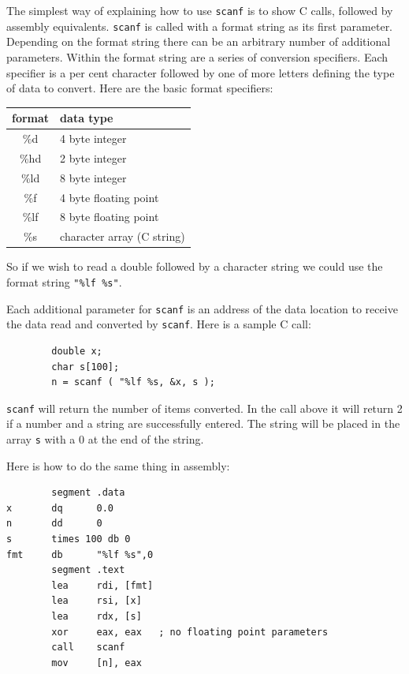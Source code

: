 \documentclass[11pt,b5paper]{book}
\begin{document}
The simplest way of explaining how to use {\tt scanf} is to show C calls, followed by assembly
equivalents.
{\tt scanf} is called with a format string as its first parameter. 
Depending on the format string there can be an arbitrary number of additional parameters.
Within the format string are a series of conversion specifiers.
Each specifier is a per cent character followed by one of more letters defining the type of data to convert.
Here are the basic format specifiers:
\begin{center}
    \begin{tabular}{|c|l|}
         \hline
         format & data type \\
         \hline
         \%d    & 4 byte integer \\
         \hline
         \%hd   & 2 byte integer \\
         \hline
         \%ld   & 8 byte integer \\
         \hline
         \%f    & 4 byte floating point \\
         \hline 
         \%lf   & 8 byte floating point \\
         \hline
         \%s    & character array (C string) \\
         \hline
    \end{tabular}
\end{center}
So if we wish to read a double followed by a character string we could use the format string
{\tt "\%lf \%s"}.

Each additional parameter for {\tt scanf} is an address of the data location to receive the data
read and converted by {\tt scanf}.
Here is a sample C call:
\begin{verbatim}
        double x;
        char s[100];
        n = scanf ( "%lf %s, &x, s );
\end{verbatim}

{\tt scanf} will return the number of items converted.
In the call above it will return 2 if a number and a string are successfully entered.
The string will be placed in the array {\tt s} with a 0 at the end of the string.

Here is how to do the same thing in assembly:
\begin{verbatim}
        segment .data
x       dq      0.0
n       dd      0
s       times 100 db 0
fmt     db      "%lf %s",0
        segment .text
        lea     rdi, [fmt]
        lea     rsi, [x]
        lea     rdx, [s]
        xor     eax, eax   ; no floating point parameters
        call    scanf
        mov     [n], eax
\end{verbatim}
\end{document}
